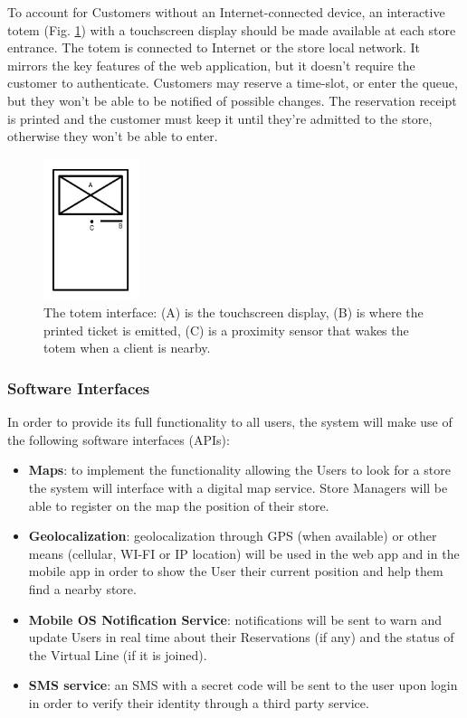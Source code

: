 To account for Customers without an Internet-connected device,
an interactive totem (Fig. \ref{fig:totem}) with a touchscreen display should be made available at each store entrance.
The totem is connected to Internet or the store local network.
It mirrors the key features of the web application, but it doesn't require the customer to
authenticate. Customers may reserve a time-slot, or enter the queue, but they won't be able to
be notified of possible changes. The reservation receipt is printed and the customer must keep it until they're
admitted to the store, otherwise they won't be able to enter.
\begin{figure}[H]
    \centering
    \includegraphics[width=0.25\textwidth]{images/totem.pdf}
    \caption{The totem interface: (A) is the touchscreen display,
    (B) is where the printed ticket is emitted, (C) is a proximity sensor that wakes the
    totem when a client is nearby.}
    \label{fig:totem}
\end{figure}

\subsubsection{Software Interfaces}
In order to provide its full functionality to all users, the system will make use of the following software interfaces (APIs):
\begin{itemize}
    \item \textbf{Maps}: to implement the functionality allowing the Users to look for a store the system will interface with a digital map service. Store Managers will be able to register on the map the position of their store.
    \item \textbf{Geolocalization}: geolocalization through GPS (when available) or other means (cellular, WI-FI or IP location) will be used in the web app and in the mobile app in order to show the User their current position and help them find a nearby store.
    \item \textbf{Mobile OS Notification Service}: notifications will be sent to warn and update Users in real time about their Reservations (if any) and the status of the Virtual Line (if it is joined).
    \item \textbf{SMS service}: an SMS with a secret code will be sent to the user upon login in order to verify their identity through a third party service.
\end{itemize}

